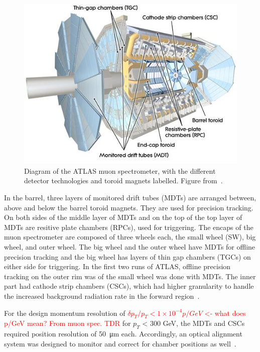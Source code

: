 \begin{figure}
    \centering
    \includegraphics[width = \textwidth]{figures/atlas_muon_spectrometer.jpg}
    \caption{Diagram of the ATLAS muon spectrometer, with the different detector technologies and toroid magnets labelled. Figure from~\cite{collaboration_atlas_2008}.}
    \label{fig:atlas_muon_spectrometer}
\end{figure}

In the barrel, three layers of monitored drift tubes (MDTs) are arranged between, above and below the barrel toroid magnets. They are used for precision tracking. On both sides of the middle layer of  MDTs and on the top of the top layer of MDTs are resitive plate chambers (RPCs), used for triggering. The encaps of the muon spectrometer are composed of three wheels each, the small wheel (SW), big wheel, and outer wheel. The big wheel and the outer wheel have MDTs for offline precision tracking and the big wheel has layers of thin gap chambers (TGCs) on either side for triggering. In the first two runs of ATLAS, offline precision tracking on the outer rim was of the small wheel was done with MDTs. The inner part had cathode strip chambers (CSCs), which had higher granularity to handle the increased background radiation rate in the forward region~\cite{atlas_muon_spectrometer_tdr}. 

For the design momentum resolution of \textcolor{red}{$\delta p_T / p_T < 1\times10^{-4} p / GeV$ <- what does p/GeV mean? From muon spec. TDR} for $p_T$ < 300 GeV, the MDTs and CSCs required position resolution of \SI{50}{\micro\meter} each. Accordingly, an optical alignment system was designed to monitor and correct for chamber positions as well~\cite{atlas_muon_spectrometer_tdr, aefsky_optical_2008}.

